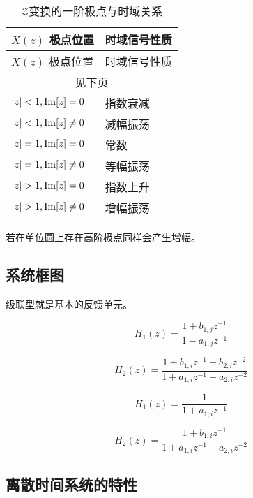 \documentclass[cn,11pt,chinese,black,simple]{../elegantbook}
\begin{document}
\begin{longtable}{ll} 
    \caption{\(\mathscr{Z}\)变换的一阶极点与时域关系} \\ 
    \toprule
    \(X(z)\) 极点位置 & 时域信号性质\\ 
    \midrule
    \endfirsthead
    
    \toprule
    \(X(z)\) 极点位置 & 时域信号性质\\ 
    \midrule
    \endhead 
  
    \hline
    \multicolumn{2}{c}{见下页}\\   \bottomrule
    \endfoot
  
    \bottomrule
    \endlastfoot
    
    \(\left| z \right| < 1, \operatorname{Im}[z] = 0\) & 指数衰减 \\
    \(\left| z \right| < 1, \operatorname{Im}[z] \neq 0\) & 减幅振荡 \\
    \(\left| z \right| = 1, \operatorname{Im}[z] = 0\) & 常数 \\
    \(\left| z \right| = 1, \operatorname{Im}[z] \neq 0\) & 等幅振荡 \\
    \(\left| z \right| > 1, \operatorname{Im}[z] = 0\) & 指数上升 \\
    \(\left| z \right| > 1, \operatorname{Im}[z] \neq 0\) & 增幅振荡 \\


\end{longtable}

若在单位圆上存在高阶极点同样会产生增幅。

\subsection{系统框图}

级联型就是基本的反馈单元。


\[H_1(z) = \dfrac{1+b_{1,j}z^{-1}}{1-a_{1,j}z^{-1}}\]

\[H_{2}(z)=\dfrac{1+b_{1, i} z^{-1}+b_{2, i} z^{-2}}{1+a_{1, i} z^{-1}+a_{2, i} z^{-2}}\]


\[H_{1}(z)=\dfrac{1}{1+a_{1, i} z^{-1}} \]

\[ H_{2}(z)=\dfrac{1+b_{1, i} z^{-1}}{1+a_{1, i} z^{-1}+a_{2, i} z^{-2}}\]

\subsection{离散时间系统的特性}
\end{document}
